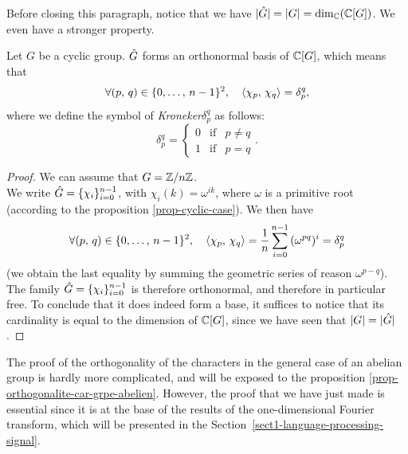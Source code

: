 Before closing this paragraph, notice that we have $|\hat{G}| = |G| = \dim_{\mathbb{C}}(\mathbb{C}[G])$. We even have a stronger property.

\begin{prop}
\label{prop-base-ortho-cyclic-case}
 Let $G$ be a cyclic group. $\hat{G}$ forms an orthonormal basis of $\mathbb{C}[G]$, which means that
\begin{equation*}
\forall (p, \, q) \in \{0, \ldots, \, n-1\}^2, \quad \langle \chi_p,\,\chi_q\rangle = \delta_p^q,
\end{equation*}
where we define the symbol of \textit{Kroneker}$\delta_p^q $ as follows:
\begin{equation*}
\delta_p^q = \left\{\begin{array}{ccc} 0 & \text{if} & p \neq q \\1 & \text{if} & p = q \end{array} \right. .
\end{equation*}
 \label{notation-14}
\end{prop}

\begin{proof}
We can assume that $ G = \mathbb{Z}/n\mathbb{Z}$. \\We write $\hat{G} = \{\chi_i\}_{i = 0}^{n-1}$, with $\chi_i (k) = \omega^{ik}$, where $\omega $ is a primitive  root (according to the proposition \ref{prop-cyclic-case}). We then have
\begin{equation}
\label{eq-orthogonalite-cyclic-case}
\forall (p, \, q) \in \{0, \ldots, \, n-1\}^2, \quad \langle \chi_p,\,\chi_q\rangle = \frac{1}{n} \sum_{i = 0}^{n-1}{(\omega^{pq})^{i}} = \delta_p^q
\end{equation}
(we obtain the last equality by summing the geometric series of reason $\omega^{p-q}$). \\The family $\hat{G} = \{\chi_i\}_{i = 0}^{n-1}$ is therefore orthonormal, and therefore in particular free. To conclude that it does indeed form a base, it suffices to notice that its cardinality is equal to the dimension of $\mathbb{C}[G]$, since we have seen that $|G| = |\hat{G}|$.
\end{proof}


\begin{rem}
The proof of the orthogonality of the characters in the general case of an abelian group is hardly more complicated, and will be exposed to the proposition \ref{prop-orthogonalite-car-grpe-abelien}. However, the proof that we have just made is essential since it is at the base of the results of the one-dimensional Fourier transform, which will be presented in the Section~\ref{sect1-language-processing-signal}.
\end{rem}

